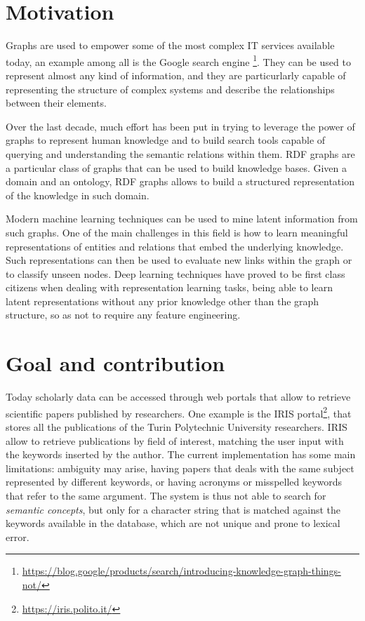 \documentclass[%
    corpo=13.5pt,
    twoside,
    oldstyle,
    tipotesi=magistrale,
    greek,
    evenboxes
]{toptesi}
\begin{document}
\section{Motivation}

Graphs are used to empower some of the most complex IT services available
today, an example among all is the Google search engine
\footnote{\url{https://blog.google/products/search/introducing-knowledge-graph-things-not/}}.
They can be used to represent almost any kind of information, and they are
particurlarly capable of representing the structure of complex systems and
describe the relationships between their elements.

Over the last decade, much effort has been put in trying to leverage the power
of graphs to represent human knowledge and to build search tools capable of
querying and understanding the semantic relations within them. RDF graphs are a
particular class of graphs that can be used to build knowledge
bases. Given a domain and an ontology, RDF graphs allows to build a structured
representation of the knowledge in such domain.

Modern machine learning techniques can be used to mine latent information
from such graphs. One of the main challenges in this field is how to learn
meaningful representations of entities and relations that embed
the underlying knowledge. Such representations can then be used to evaluate
new links within the graph or to classify unseen nodes.
Deep learning techniques have proved to be first class citizens when
dealing with representation learning tasks, being able to learn latent
representations without any prior knowledge other than the graph structure,
so as not to require any feature engineering.

\section{Goal and contribution}

Today scholarly data can be accessed through web portals that allow to retrieve
scientific papers published by researchers. One example is the IRIS
portal\footnote{\url{https://iris.polito.it/}}, that stores all the
publications of the Turin Polytechnic University researchers.
IRIS allow to retrieve publications by field of interest, matching the user
input with the keywords inserted by the author.
The current implementation has some main limitations: ambiguity may arise,
having papers that deals with the same subject represented by different
keywords, or having acronyms or misspelled keywords that refer to the
same argument.
The system is thus not able to search for \emph{semantic concepts}, but only
for a character string that is matched against the keywords available in the
database, which are not unique and prone to lexical error.
\end{document}
